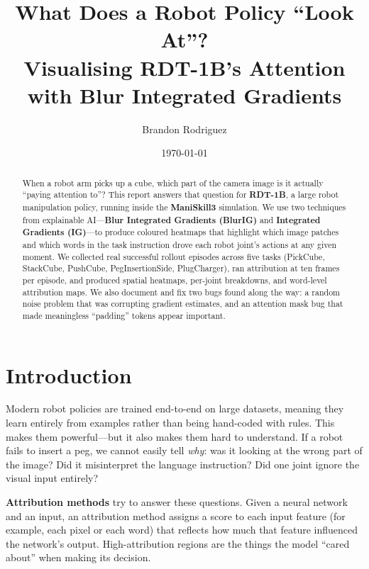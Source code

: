 \documentclass[11pt,a4paper]{article}
\title{\textbf{What Does a Robot Policy ``Look At''?}\\
\large Visualising RDT-1B's Attention with Blur Integrated Gradients}
\author{Brandon Rodriguez}
\date{\today}
\begin{document}
\maketitle

\begin{abstract}
When a robot arm picks up a cube, which part of the camera image is it actually
``paying attention to''? This report answers that question for \textbf{RDT-1B},
a large robot manipulation policy, running inside the \textbf{ManiSkill3} simulation.
We use two techniques from explainable AI---\textbf{Blur Integrated Gradients (BlurIG)}
and \textbf{Integrated Gradients (IG)}---to produce coloured heatmaps that highlight
which image patches and which words in the task instruction drove each robot
joint's actions at any given moment. We collected real successful rollout episodes
across five tasks (PickCube, StackCube, PushCube, PegInsertionSide, PlugCharger),
ran attribution at ten frames per episode, and produced spatial heatmaps, per-joint
breakdowns, and word-level attribution maps. We also document and fix two bugs
found along the way: a random noise problem that was corrupting gradient estimates,
and an attention mask bug that made meaningless ``padding'' tokens appear important.
\end{abstract}

\tableofcontents
\newpage

\section{Introduction}

Modern robot policies are trained end-to-end on large datasets, meaning they
learn entirely from examples rather than being hand-coded with rules. This makes
them powerful---but it also makes them hard to understand. If a robot fails to
insert a peg, we cannot easily tell \emph{why}: was it looking at the wrong part
of the image? Did it misinterpret the language instruction? Did one joint ignore
the visual input entirely?

\textbf{Attribution methods} try to answer these questions. Given a neural network
and an input, an attribution method assigns a score to each input feature (for
example, each pixel or each word) that reflects how much that feature influenced
the network's output. High-attribution regions are the things the model ``cared
about'' when making its decision.
\end{document}
